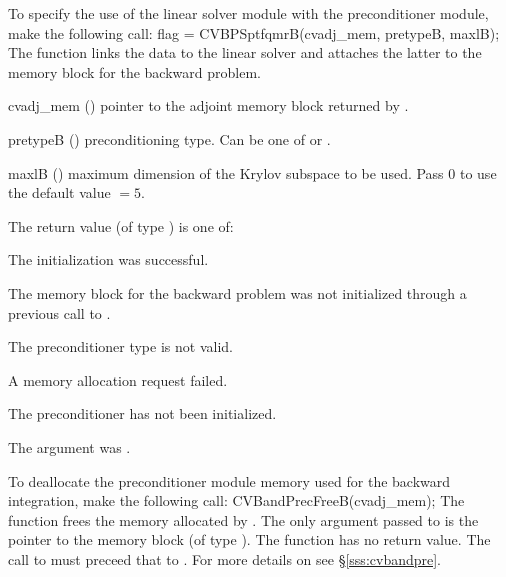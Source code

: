 {}
To specify the use of the {\cvsptfqmr} linear solver module with the {\cvbandpre} 
preconditioner module, make the following call:
{
  flag = CVBPSptfqmrB(cvadj\_mem, pretypeB, maxlB);
}
{
  The function  links the {\cvbandpre} data to the
  {\cvsptfqmr} linear solver and attaches the latter to the {\cvodes}
  memory block for the backward problem.
}
{
  \begin{args}
  \item[cvadj\_mem] ()
    pointer to the adjoint memory block returned by .
  \item[pretypeB] ()
    preconditioning type. Can be one of  or .
  \item[maxlB] ()
    maximum dimension of the Krylov subspace to be used. Pass $0$ to use the 
    default value $=5$.
  \end{args}
}
{
  The return value  (of type ) is one of:
  \begin{args}
  \item[\Id{CVBANDPRE\_ADJMEM\_NULL}]
    The {\cvsptfqmr} initialization was successful.
  \item[\Id{CVSPILS\_MEM\_NULL}]
    The {\cvodes} memory block for the backward problem was not initialized through a 
    previous call to .
  \item[\Id{CVSPILS\_ILL\_INPUT}]
    The preconditioner type  is not valid.
  \item[\Id{CVSPILS\_MEM\_FAIL}]
    A memory allocation request failed.
  \item[\Id{CVBANDPRE\_PDATA\_NULL}]
    The {\cvbandpre} preconditioner has not been initialized.
  \item[\Id{CVBANDPRE\_ADJMEM\_NULL}]
    The  argument was .
  \end{args}
}
{}
To deallocate the {\cvbandpre} preconditioner module memory used for the
backward integration, make the following call:
{
  CVBandPrecFreeB(cvadj\_mem);
}
{
  The function  frees the memory allocated by
  .
}
{
  The only argument passed to  is the pointer to the {\cvodea} 
  memory block (of type ).
}
{
  The function  has no return value.
}
{
  The call to  must preceed that to .
}
For more details on {\cvbandpre} see \S\ref{sss:cvbandpre}.

